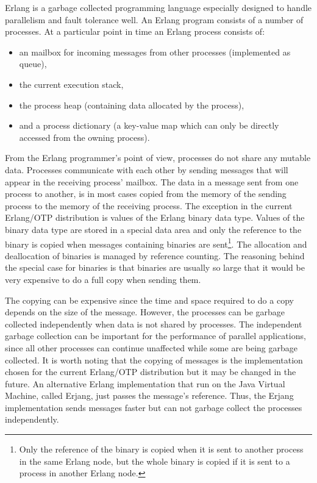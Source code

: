 \documentclass[aps,pre,preprint,nofootinbib]{revtex4}
\begin{document}
Erlang is a garbage collected programming language especially designed to handle parallelism and fault tolerance well.
An Erlang program consists of a number of processes.
At a particular point in time an Erlang process consists of:
\begin{itemize}
 \item an mailbox for incoming messages from other processes (implemented as queue),
 \item the current execution stack,
 \item the process heap (containing data allocated by the process),
 \item and a process dictionary (a key-value map which can only be directly accessed from the owning process).
\end{itemize}
From the Erlang programmer's point of view, processes do not share any mutable data.
Processes communicate with each other by sending messages that will appear in the receiving process' mailbox.
The data in a message sent from one process to another, is in most cases copied from the memory of the sending process to the memory of the receiving process.
The exception in the current Erlang/OTP distribution is values of the Erlang binary data type.
Values of the binary data type are stored in a special data area and only the reference to the binary is copied when messages containing binaries are sent\footnote{Only the reference of the binary is copied when it is sent to another process in the same Erlang node, but the whole binary is copied if it is sent to a process in another Erlang node.}.
The allocation and deallocation of binaries is managed by reference counting.
The reasoning behind the special case for binaries is that binaries are usually so large that it would be very expensive to do a full copy when sending them.

The copying can be expensive since the time and space required to do a copy depends on the size of the message.
However, the processes can be garbage collected independently when data is not shared by processes.
The independent garbage collection can be important for the performance of parallel applications, since all other processes can continue unaffected while some are being garbage collected.
It is worth noting that the copying of messages is the implementation chosen for the current Erlang/OTP distribution but it may be changed in the future.
An alternative Erlang implementation that run on the Java Virtual Machine, called Erjang, just passes the message's reference.
Thus, the Erjang implementation sends messages faster but can not garbage collect the processes independently.
\end{document}
